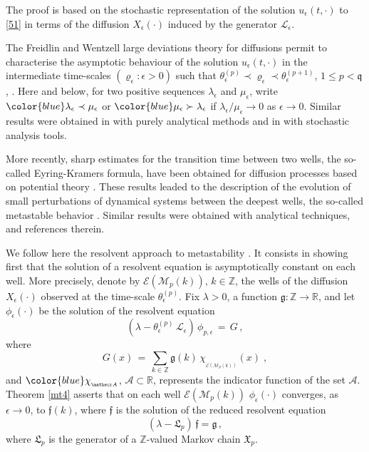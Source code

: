 \documentclass[reqno]{amsart}
\theoremstyle{plain}
\theoremstyle{definition}
\newcommand{\mf}[1]{{\mathfrak #1}}
\newcommand{\bb}[1]{{\mathbb #1}}
\newcommand{\ms}[1]{{\mathscr #1}}
\newcounter{as}[section]
\newcommand{\<}{\langle}
\renewcommand{\>}{\rangle}
\begin{document}
The proof is based on the stochastic representation of the solution
$u_\epsilon(t, \cdot)$ to \eqref{51} in terms of the diffusion
$X_\epsilon(\cdot)$ induced by the generator $\ms L_\epsilon$.

The Freidlin and Wentzell \cite{fw} large deviations theory for
diffusions permit to characterise the asymptotic behaviour of the
solution $u_\epsilon(t, \cdot)$ in the intermediate time-scales
$(\varrho_\epsilon :\epsilon >0)$ such that
$\theta^{(p)}_{\epsilon} \prec \varrho_\epsilon \prec
\theta^{(p+1)}_{\epsilon}$, $1\le p<\mf q$, \cite{fk10a, fk10b,
kt16}. Here and below, for two positive sequences $\lambda_{\epsilon}$
and $\mu_\epsilon$, write
${\color{blue}\lambda_{\epsilon}\prec\mu_{\epsilon}}$ or
${\color{blue} \mu_{\epsilon} \succ \lambda_{\epsilon}}$ if
$\lambda_{\epsilon}/\mu_{\epsilon}\to0$ as $\epsilon\rightarrow0$.
Similar results were obtained in \cite{is15, is17} with purely
analytical methods and in \cite{Miclo2} with stochastic analysis
tools.

More recently, sharp estimates for the transition time between two
wells, the so-called Eyring-Kramers formula, have been obtained for
diffusion processes \cite{BEGK, LMS2, LS-22} based on potential theory
\cite{l-review}. These results leaded to the description of the
evolution of small perturbations of dynamical systems between the
deepest wells, the so-called metastable behavior \cite{RS,
LS-22b}. Similar results were obtained with analytical techniques,
\cite{LM, BLS} and references therein.

We follow here the resolvent approach to metastability \cite{llm,
lms}.  It consists in showing first that the solution of a resolvent
equation is asymptotically constant on each well. More precisely,
denote by $\ms E(\ms M_p(k))$, $k\in \bb Z$, the wells of the
diffusion $X_\epsilon(\cdot)$ observed at the time-scale
$\theta_{\epsilon}^{(p)}$. Fix $\lambda>0$, a function
$\mf g \colon \bb Z\to \bb R$, and let $\phi_\epsilon(\cdot)$ be the
solution of the resolvent equation
\begin{equation}
\label{41}
(\lambda - \theta_{\epsilon}^{(p)}\,
\ms L_{\epsilon})\, \phi_{p,\epsilon} \,=\, G \,,
\end{equation}
where
\begin{equation}
\label{55}
G (x) \,=\, \sum_{k\in \bb Z} \mf g (k)\,
\chi_{_{\ms E (\ms M_{p}(k))}} (x)\;,
\end{equation}
and $\color{blue} \chi_{_{\ms A}}$, $\ms A \subset \bb R$, represents
the indicator function of the set $\ms A$.  Theorem \ref{mt4} asserts
that on each well $\ms E(\ms M_p(k))$ $\phi_\epsilon(\cdot)$
converges, as $\epsilon\to 0$, to $\mf f(k)$, where $\mf f$ is the
solution of the reduced resolvent equation
\begin{equation*}
(\lambda - \mf L_p) \, \mf f = \mf g\,,    
\end{equation*}
where $\mf L_p$ is the generator of a $\bb Z$-valued Markov chain $\mf
X_p$. 
\end{document}

